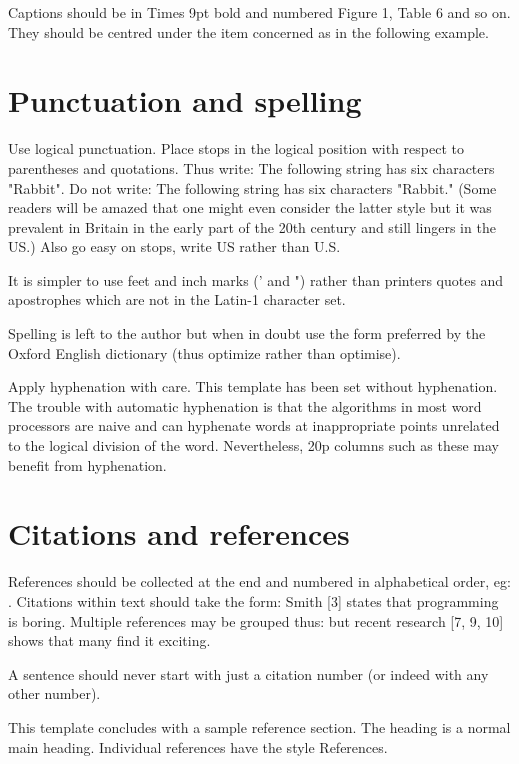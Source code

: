 \documentclass{AUJarticle}
\begin{document}
Captions should be in Times 9pt bold and numbered Figure 1, Table 6 and so on. They should be
centred under the item concerned as in the following example.

\section{Punctuation and spelling}

Use logical punctuation. Place stops in the logical position with respect to parentheses and
quotations. Thus write: The following string has six characters "Rabbit". Do not write: The
following string has six characters "Rabbit." (Some readers will be amazed that one might even
consider the latter style but it was prevalent in Britain in the early part of the 20th century
and still lingers in the US.) Also go easy on stops, write US rather than U.S.

It is simpler to use feet and inch marks (' and ") rather than printers quotes and apostrophes
which are not in the Latin-1 character set.

Spelling is left to the author but when in doubt use the form preferred by the Oxford English
dictionary (thus optimize rather than optimise).

Apply hyphenation with care. This template has been set without hyphenation. The trouble with
automatic hyphenation is that the algorithms in most word processors are naive and can hyphenate
words at inappropriate points unrelated to the logical division of the word. Nevertheless, 20p
columns such as these may benefit from hyphenation.

\section{Citations and references}

References should be collected at the end and numbered in alphabetical order, eg:
\cite{Higgon1994, Dirac1930, Dijkstra1968,Keller2000}. Citations within text should take the
form: Smith [3] states that programming is boring. Multiple references may be grouped thus: but
recent research [7, 9, 10] shows that many find it exciting.

A sentence should never start with just a citation number (or indeed with any other number).

This template concludes with a sample reference section. The heading is a normal main heading.
Individual references have the style References.



\balance
\end{document}
